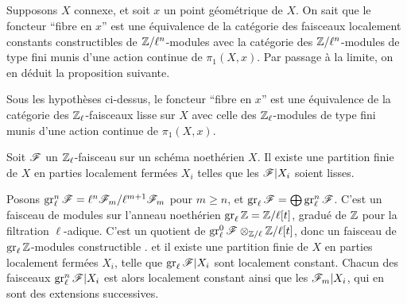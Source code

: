 \subsection{}\label{II:2-3}

Supposons $X$ connexe, et soit $x$ un point géométrique de $X$. On sait que 
le foncteur ``fibre en $x$'' est une équivalence de la catégorie des 
faisceaux localement constants constructibles de $\mathbb{Z}/\ell^n$-modules avec la 
catégorie des $\mathbb{Z}/\ell^n$-modules de type fini munis d'une action continue 
de $\pi_1(X,x)$. Par passage à la limite, on en déduit la proposition 
suivante. 





\begin{proposition_}\label{II:2-4}
Sous les hypothèses ci-dessus, le foncteur ``fibre en $x$'' est une 
équivalence de la catégorie des $\mathbb{Z}_\ell$-faisceaux lisse sur $X$ avec 
celle des $\mathbb{Z}_\ell$-modules de type fini munis d'une action continue de 
$\pi_1(X,x)$. 
\end{proposition_}





\begin{proposition_}\label{II:2-5}
Soit $\mathscr{F}$ un $\mathbb{Z}_\ell$-faisceau sur un schéma noethérien $X$. Il existe 
une partition finie de $X$ en parties localement fermées $X_i$ telles que 
les $\mathscr{F}|X_i$ soient lisses.
\end{proposition_}

Posons $\operatorname{gr}_\ell^n\mathscr{F}=\ell^n\mathscr{F}_m/\ell^{m+1}\mathscr{F}_m$ pour $m\geqslant n$, et 
$\operatorname{gr}_\ell\mathscr{F}=\bigoplus \operatorname{gr}_\ell^n\mathscr{F}$. C'est un faisceau de modules sur 
l'anneau noethérien $\operatorname{gr}_\ell\mathbb{Z}=\mathbb{Z}/\ell[t]$, gradué de $\mathbb{Z}$ pour la 
filtration $\ell$-adique. C'est un quotient de 
$\operatorname{gr}_\ell^0\mathscr{F} \otimes_{\mathbb{Z}/\ell} \mathbb{Z}/\ell[t]$, donc un faisceau de 
$\operatorname{gr}_\ell\mathbb{Z}$-modules constructible \cite[IX.2]{sga4}. et il existe une partition 
finie de $X$ en parties localement fermées $X_i$, telle que 
$\operatorname{gr}_\ell \mathscr{F}|X_i$ sont localement constant. Chacun des faisceaux 
$\operatorname{gr}_\ell^n\mathscr{F}|X_i$ est alors localement constant ainsi que les $\mathscr{F}_m|X_i$, 
qui en sont des extensions successives. 





\subsection{}\label{II:2-6}

